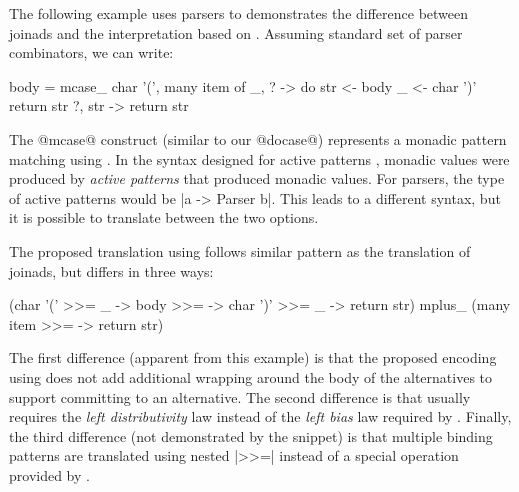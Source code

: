 \documentclass[preprint]{sigplanconf}
\begin{document}
The following example uses parsers to demonstrates the difference between joinads and the 
interpretation based on . Assuming standard set of parser combinators, we can write:

\begin{code}
body = mcase_ char '(', many item of 
  _, ? -> do  str <- body
              _ <- char ')'
              return str
  ?, str -> return str
\end{code}
The @mcase@ construct (similar to our @docase@) represents a monadic pattern matching using 
. In the syntax designed for active patterns \cite{activepatterns}, monadic 
values were produced by \textit{active patterns} that produced monadic values. For parsers, the 
type of active patterns would be |a -> Parser b|. This leads to a different syntax, but it is 
possible to translate between the two options.

The proposed translation using  follows similar pattern as the translation of joinads,
but differs in three ways:

\begin{code}
(char '(' >>= \_ -> body >>= \str ->
    char ')' >>= \_ -> return str) mplus_
(many item >>= \str -> return str)
\end{code}
The first difference (apparent from this example) is that the proposed encoding using 
does not add additional wrapping around the body of the alternatives to support committing to an 
alternative. The second difference is that  usually requires the \textit{left
distributivity} law instead of the \textit{left bias} law required by . Finally, the 
third difference (not demonstrated by the snippet) is that multiple binding patterns are translated 
using nested |>>=| instead of a special operation provided by . 
\end{document}
